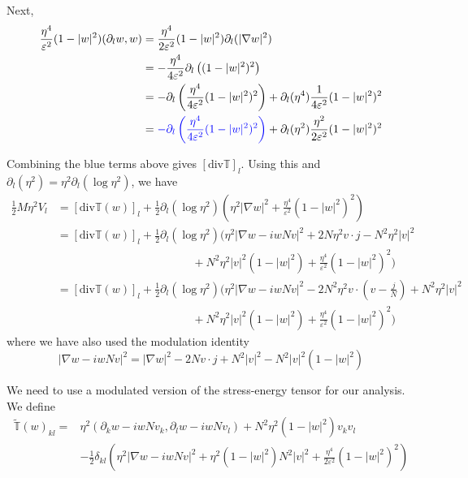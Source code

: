 \documentclass[a4paper]{article}
\renewcommand{\div}{\mathrm{div}}
\begin{document}
Next,
\begin{align}
  \frac{\eta^4}{\varepsilon^2} (1-|w|^2) (\partial_l w, w) &= \frac{\eta^4}{2 \varepsilon^2 } (1 - |w|^2) \partial_l ( |\nabla w|^2 ) \nonumber \\
  &= - \frac{\eta^4}{4 \varepsilon^2} \partial_l \left( (1-|w|^2)^2 \right) \nonumber \\
  &= - \partial_l \left( \frac{\eta^4}{4 \varepsilon^2} (1-|w|^2)^2 \right) + \partial_l (\eta^4) \frac{1}{4 \varepsilon^2} (1-|w|^2)^2 \nonumber \\
  &= { \color{blue} - \partial_l \left( \frac{\eta^4}{4 \varepsilon^2} (1-|w|^2)^2 \right) } + \partial_l (\eta^2) \frac{\eta^2}{2 \varepsilon^2}
  (1-|w|^2)^2
  \label{eq:V_l_term2}
\end{align}

Combining the blue terms above gives $[\div \mathbb{T}]_l$. Using this and $\partial_l (\eta^2) = \eta^2 \partial_l (\log \eta^2)$, we have
\begin{align}
  \frac{1}{2} M \eta^2 V_l &= [ \div \mathbb{T}(w) ]_l + \frac{1}{2} \partial_l (\log \eta^2) \left( \eta^2 |\nabla w|^2 + \frac{\eta^4}{\varepsilon^2} (
  1-|w|^2)^2 \right) \nonumber \\
  &= [ \div \mathbb{T}(w) ]_l + \frac{1}{2} \partial_l (\log \eta^2) \bigg( \eta^2 | \nabla w - i w N v |^2 + 2 N \eta^2 v \cdot j - N^2 \eta^2 |v|^2
  \nonumber \\
  &\hspace{5cm} + N^2 \eta^2 |v|^2 (1-|w|^2) + \frac{\eta^4}{\varepsilon^2} (1-|w|^2)^2 \bigg) \nonumber \\
  &= [ \div \mathbb{T}(w) ]_l + \frac{1}{2} \partial_l (\log \eta^2) \bigg( \eta^2 |\nabla w - i w N v|^2 - 2N^2 \eta^2 v \cdot \left( v -
  \frac{j}{N} \right) + N^2 \eta^2 |v|^2 \nonumber \\
  &\hspace{5cm} + N^2 \eta^2 |v|^2 (1-|w|^2) + \frac{\eta^4}{\varepsilon^2} (1-|w|^2)^2 \bigg)
  \label{eq:V_l-final}
\end{align}
where we have also used the modulation identity
\begin{equation}
  | \nabla w - i w N v |^2 = |\nabla w|^2 - 2N v \cdot j + N^2 |v|^2 - N^2 |v|^2 (1-|w|^2)
  \label{eq:mod_identity}
\end{equation}

We need to use a modulated version of the stress-energy tensor for our analysis. We define
\begin{align}
  \tilde{\mathbb{T}}(w)_{kl} = &\eta^2 (\partial_k w - i w N v_k, \partial_l w - i w N v_l) + N^2 \eta^2 (1-|w|^2)v_k v_l \nonumber \\
  &- \frac{1}{2} \delta_{kl} \left( \eta^2 |\nabla w - i w N v|^2 + \eta^2 (1-|w|^2)N^2|v|^2 + \frac{\eta^4}{2 \varepsilon^2} (1-|w|^2)^2 \right)
  \label{def:mod_stress-energy}
\end{align}
\end{document}

